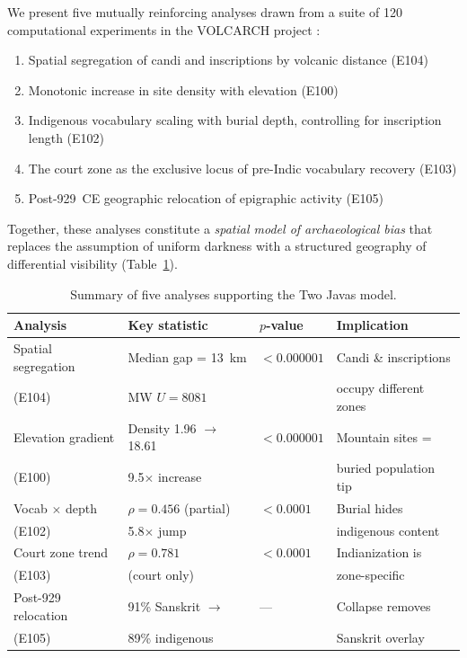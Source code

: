 \documentclass[12pt]{article}
\begin{document}
We present five mutually reinforcing analyses drawn from a suite of 120 computational experiments in the VOLCARCH project \citep{Amien2026a}:
\begin{enumerate}
    \item Spatial segregation of candi and inscriptions by volcanic distance (E104)
    \item Monotonic increase in site density with elevation (E100)
    \item Indigenous vocabulary scaling with burial depth, controlling for inscription length (E102)
    \item The court zone as the exclusive locus of pre-Indic vocabulary recovery (E103)
    \item Post-929~CE geographic relocation of epigraphic activity (E105)
\end{enumerate}

Together, these analyses constitute a \emph{spatial model of archaeological bias} that replaces the assumption of uniform darkness with a structured geography of differential visibility (Table~\ref{tab:summary}).

\begin{table}[htbp]
\centering
\caption{Summary of five analyses supporting the Two Javas model.}
\label{tab:summary}
\begin{tabular}{llll}
\toprule
\textbf{Analysis} & \textbf{Key statistic} & \textbf{$p$-value} & \textbf{Implication} \\
\midrule
Spatial segregation & Median gap = 13~km & $< 0.000001$ & Candi \& inscriptions \\
(E104) & MW $U = 8081$ & & occupy different zones \\
\addlinespace
Elevation gradient & Density 1.96 $\rightarrow$ 18.61 & $< 0.000001$ & Mountain sites = \\
(E100) & 9.5$\times$ increase & & buried population tip \\
\addlinespace
Vocab $\times$ depth & $\rho = 0.456$ (partial) & $< 0.0001$ & Burial hides \\
(E102) & 5.8$\times$ jump & & indigenous content \\
\addlinespace
Court zone trend & $\rho = 0.781$ & $< 0.0001$ & Indianization is \\
(E103) & (court only) & & zone-specific \\
\addlinespace
Post-929 relocation & 91\% Sanskrit $\rightarrow$ & --- & Collapse removes \\
(E105) & 89\% indigenous & & Sanskrit overlay \\
\bottomrule
\end{tabular}
\end{table}
\end{document}
